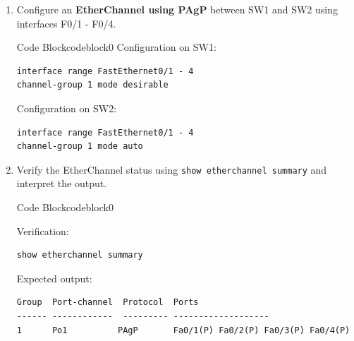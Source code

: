 \documentclass[a4paper]{article}
\begin{document}
\begin{enumerate}
	\item Configure an \textbf{EtherChannel using PAgP} between SW1 and SW2 using interfaces F0/1 - F0/4.



	      \begin{ocg}{Code Block}{codeblock}{0}
		      \vspace{0.5cm}
		      Configuration on SW1:
		      \begin{lstlisting}
interface range FastEthernet0/1 - 4
channel-group 1 mode desirable
\end{lstlisting}


		      \vspace{0.5cm}
		      Configuration on SW2:
		      \begin{lstlisting}
interface range FastEthernet0/1 - 4
channel-group 1 mode auto

\end{lstlisting}

	      \end{ocg}


	\item Verify the EtherChannel status using \texttt{show etherchannel summary} and interpret the output.

	      \begin{ocg}{Code Block}{codeblock}{0}

		      \vspace{0.5cm}
		      Verification:
		      \begin{lstlisting}
show etherchannel summary
          \end{lstlisting}

		      \vspace{0.5cm}
		      Expected output:
		      \begin{lstlisting}[columns=fullflexible]
Group  Port-channel  Protocol  Ports  
------ ------------  --------- -------------------
1      Po1          PAgP       Fa0/1(P) Fa0/2(P) Fa0/3(P) Fa0/4(P)
          \end{lstlisting}

	      \end{ocg}



\end{enumerate}
\end{document}
